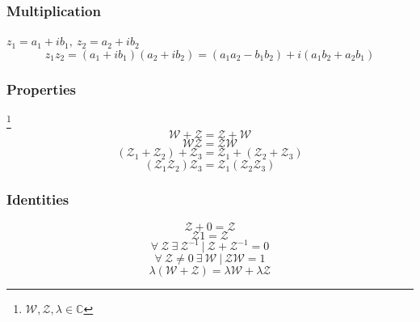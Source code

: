 \subsubsection{Multiplication}
$z_{1} = a_{1} + ib_{1}, \ z_{2} = a_{2} + ib_{2}$
$$z_{1}z_{2} =  (a_{1} + ib_{1})(a_{2} + ib_{2}) = (a_{1}a_{2} - b_{1}b_{2}) + i(a_{1}b_{2} + a_{2}b_{1})$$
\subsubsection{Properties}\footnote{$\mathcal{W}, \mathcal{Z}, \lambda \in \mathbb{C}$}
$$\mathcal{W} + \mathcal{Z} = \mathcal{Z} + \mathcal{W}$$
$$\mathcal{W}\mathcal{Z} = \mathcal{Z}\mathcal{W}$$
$$(\mathcal{Z}_1 + \mathcal{Z}_2) + \mathcal{Z}_3 = \mathcal{Z}_1 + (\mathcal{Z}_2 + \mathcal{Z}_3)$$
$$(\mathcal{Z}_1\mathcal{Z}_2)\mathcal{Z}_3 = \mathcal{Z}_1(\mathcal{Z}_2\mathcal{Z}_3)$$
\subsubsection{Identities}
$$\mathcal{Z} + 0 = \mathcal{Z}$$
$$\mathcal{Z}1 = \mathcal{Z}$$
$$\forall \ \mathcal{Z} \ \exists \ \mathcal{Z}^{-1} \ | \ \mathcal{Z} + \mathcal{Z}^{-1} = 0$$
$$\forall \  \mathcal{Z} \neq 0 \ \exists \ \mathcal{W} \ | \ \mathcal{Z}\mathcal{W} = 1$$
$$\lambda(\mathcal{W} + \mathcal{Z}) = \lambda\mathcal{W} + \lambda\mathcal{Z}$$



